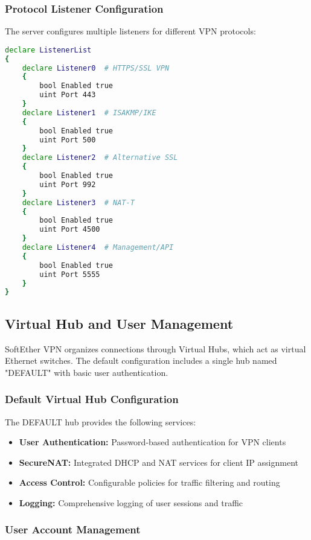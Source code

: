 \subsubsection{Protocol Listener Configuration}

The server configures multiple listeners for different VPN protocols:

\begin{lstlisting}[language=bash]
declare ListenerList
{
    declare Listener0  # HTTPS/SSL VPN
    {
        bool Enabled true
        uint Port 443
    }
    declare Listener1  # ISAKMP/IKE
    {
        bool Enabled true
        uint Port 500
    }
    declare Listener2  # Alternative SSL
    {
        bool Enabled true
        uint Port 992
    }
    declare Listener3  # NAT-T
    {
        bool Enabled true
        uint Port 4500
    }
    declare Listener4  # Management/API
    {
        bool Enabled true
        uint Port 5555
    }
}
\end{lstlisting}

\subsection{Virtual Hub and User Management}

SoftEther VPN organizes connections through Virtual Hubs, which act as virtual Ethernet switches. The default configuration includes a single hub named "DEFAULT" with basic user authentication.

\subsubsection{Default Virtual Hub Configuration}

The DEFAULT hub provides the following services:

\begin{itemize}
    \item \textbf{User Authentication:} Password-based authentication for VPN clients
    \item \textbf{SecureNAT:} Integrated DHCP and NAT services for client IP assignment
    \item \textbf{Access Control:} Configurable policies for traffic filtering and routing
    \item \textbf{Logging:} Comprehensive logging of user sessions and traffic
\end{itemize}

\subsubsection{User Account Management}

